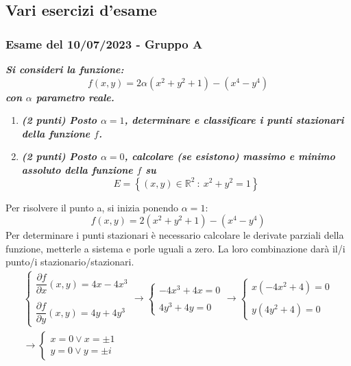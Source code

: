 \documentclass[a4paper]{article}
\begin{document}
	\subsection{Vari esercizi d'esame}

	\subsubsection{Esame del 10/07/2023 - Gruppo A}

	\textcolor{Green4}{\textbf{\emph{Si consideri la funzione:}}}
	\begin{equation*}
		f\left(x,y\right) = 2\alpha \left(x^{2} + y^{2} + 1\right) - \left(x^{4} - y^{4}\right)
	\end{equation*}
	\textcolor{Green4}{\textbf{\emph{con $\alpha$ parametro reale.}}}
	\begin{enumerate}[label=\alph*)]
		\item \textcolor{Green4}{\textbf{\emph{(2 punti) Posto $\alpha = 1$, determinare e classificare i punti stazionari della funzione $f$.}}}

		\item \textcolor{Green4}{\textbf{\emph{(2 punti) Posto $\alpha = 0$, calcolare (se esistono) massimo e minimo assoluto della funzione $f$ su}}}
		\begin{equation*}
			E = \left\{\left(x,y\right) \in \mathbb{R}^{2} \: : \: x^{2} + y^{2} = 1\right\}
		\end{equation*}
	\end{enumerate}
	Per risolvere il punto a, si inizia ponendo $\alpha = 1$:
	\begin{equation*}
		f\left(x,y\right) = 2\left(x^{2} + y^{2} + 1\right) - \left(x^{4} - y^{4}\right)
	\end{equation*}
	Per determinare i punti stazionari è necessario calcolare le derivate parziali della funzione, metterle a sistema e porle uguali a zero. La loro combinazione darà il/i punto/i stazionario/stazionari.
	\begin{gather*}
		\begin{cases}
			\dfrac{\partial f}{\partial x}\left(x,y\right) = 4x - 4x^{3} \\
			\\
			\dfrac{\partial f}{\partial y}\left(x,y\right) = 4y + 4y^{3}
		\end{cases}
		\rightarrow
		\begin{cases}
			-4x^{3} + 4x = 0 \\
			\\
			4y^{3} + 4y = 0
		\end{cases}
		\rightarrow
		\begin{cases}
			x\left(-4x^{2} + 4\right) = 0 \\
			\\
			y\left(4y^{2} + 4\right) = 0
		\end{cases}
		\\
		\rightarrow
		\begin{cases}
			x = 0 \lor x = \pm 1 \\
			y = 0 \lor y = \pm i
		\end{cases}
	\end{gather*}
\end{document}
